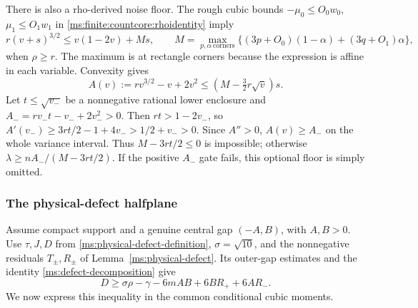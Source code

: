There is also a rho-derived noise floor. The rough cubic bounds
\(-\mu_0\le O_0w_0\), \(\mu_1\le O_1w_1\) in
\eqref{ms:finite:countcore:rhoidentity} imply
\[
 r(v+s)^{3/2}\le v(1-2v)+Ms,\qquad
 M=\max_{p,\alpha\ \mathrm{corners}}
       \{(3p+O_0)(1-\alpha)+(3q+O_1)\alpha\},
\]
when \(\rho\ge r\). The maximum is at rectangle corners because the
expression is affine in each variable. Convexity gives
\[
 A(v):=rv^{3/2}-v+2v^2
 \le (M-\tfrac32r\sqrt v)s.
\]
Let \(t\le\sqrt{v_-}\) be a nonnegative rational lower enclosure and
\(A_-=rv_-t-v_-+2v_-^2>0\). Then
\(rt>1-2v_-\), so
\(A'(v_-)\ge3rt/2-1+4v_->1/2+v_->0\).
Since \(A''>0\), \(A(v)\ge A_-\) on the whole variance interval.
Thus \(M-3rt/2\le0\) is impossible; otherwise
\(\lambda\ge nA_-/(M-3rt/2)\). If the positive \(A_-\) gate fails,
this optional floor is simply omitted.

\subsubsection{The physical-defect halfplane}

Assume compact support and a genuine central gap $(-A,B)$, with
$A,B>0$. Use $\tau,J,D$ from \eqref{ms:physical-defect-definition},
$\sigma=\sqrt{10}$, and the nonnegative residuals $T_\pm,R_\pm$ of
Lemma~\ref{ms:physical-defect}. Its outer-gap estimates and the
identity \eqref{ms:defect-decomposition} give
\begin{equation}
 D\ge\sigma\rho-\gamma-6mAB+6BR_++6AR_-.
 \label{ms:finite:countcore:physicalD}
\end{equation}
We now express this inequality in the common conditional cubic moments.

